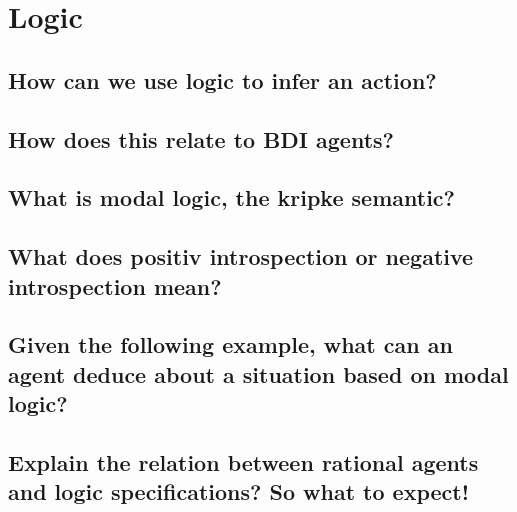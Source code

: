 \section{Logic}
\subsection{How can we use logic to infer an action?}
\subsection{How does this relate to BDI agents?}
\subsection{What is modal logic, the kripke semantic?}
\subsection{What does positiv introspection or negative introspection mean?}
\subsection{Given the following example, what can an agent deduce about a situation based on modal logic?}
\subsection{Explain the relation between rational agents and logic specifications? So what to expect!}
